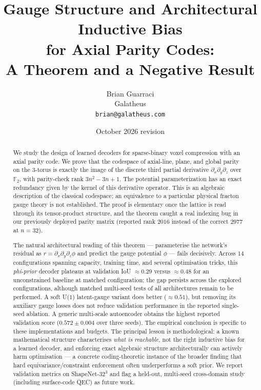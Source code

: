 \documentclass[11pt,a4paper]{article}
\title{Gauge Structure and Architectural Inductive Bias\\for Axial Parity Codes:\\A Theorem and a Negative Result}
\author{Brian Guarraci\\
  Galatheus\\
  \texttt{brian@galatheus.com}}
\date{October 2026 revision}
\begin{document}
\maketitle

\begin{abstract}
We study the design of learned decoders for sparse-binary voxel
compression with an axial parity code. We prove that the codespace of
axial-line, plane, and global parity on the 3-torus is exactly the
image of the discrete third partial derivative $\partial_x \partial_y
\partial_z$ over $\mathbb{F}_2$, with parity-check rank $3n^2 - 3n + 1$. The potential parameterization
has an exact redundancy given by the kernel of this derivative operator.
This is an algebraic description of the classical codespace; an equivalence
to a particular physical fracton gauge theory is not established. The proof is elementary
once the lattice is read through its tensor-product structure, and the
theorem caught a real indexing bug in our previously deployed parity
matrix (reported rank $2016$ instead of the correct $2977$ at $n=32$).

The natural architectural reading of this theorem --- parameterise the
network's residual as $r = \partial_x \partial_y \partial_z \phi$ and
predict the gauge potential $\phi$ --- fails decisively. Across $14$
configurations spanning capacity, training time, and several
optimisation tricks, this \emph{phi-prior} decoder plateaus at
validation IoU $\approx 0.29$ versus $\approx 0.48$ for an unconstrained
baseline at matched configuration; the gap persists across the explored configurations, although matched
multi-seed tests of all architectures remain to be performed. A soft U($1$) latent-gauge variant does
better ($\approx 0.51$), but removing its auxiliary gauge losses does not reduce validation
performance in the reported single-seed ablation. A generic multi-scale
autoencoder obtains the highest reported validation score ($0.572 \pm 0.004$
over three seeds). The empirical conclusion is specific to these implementations and budgets.
The principal lesson is methodological: a known
mathematical structure characterises \emph{what is reachable}, not the
right inductive bias for a learned decoder, and enforcing exact
algebraic structure architecturally can actively harm optimisation ---
a concrete coding-theoretic instance of the broader finding that hard
equivariance/constraint enforcement often underperforms a soft prior.
We report validation metrics on ShapeNet-$32^3$ and flag a held-out,
multi-seed cross-domain study (including surface-code QEC) as future
work.
\end{abstract}
\end{document}
